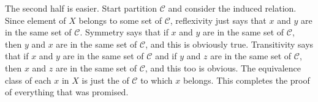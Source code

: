The second half is easier. Start partition $\mathcal{C}$ and consider the induced relation. Since element of $X$ belongs to some set of $\mathcal{C}$, reflexivity just says that $x$ and $y$ are in the same set of $\mathcal{C}$. Symmetry says that if $x$ and $y$ are in the same set of $\mathcal{C}$, then $y$ and $x$ are in the same set of $\mathcal{C}$, and this is obviously true.  Transitivity says that if $x$ and $y$ are in the same set of $\mathcal{C}$ and if $y$ and $z$ are in the same set of $\mathcal{C}$, then $x$ and $z$ are in the same set of $\mathcal{C}$, and this too is obvious. The equivalence class of each $x$ in $X$ is just the of $\mathcal{C}$ to which $x$ belongs. This completes the proof of everything that was promised.
